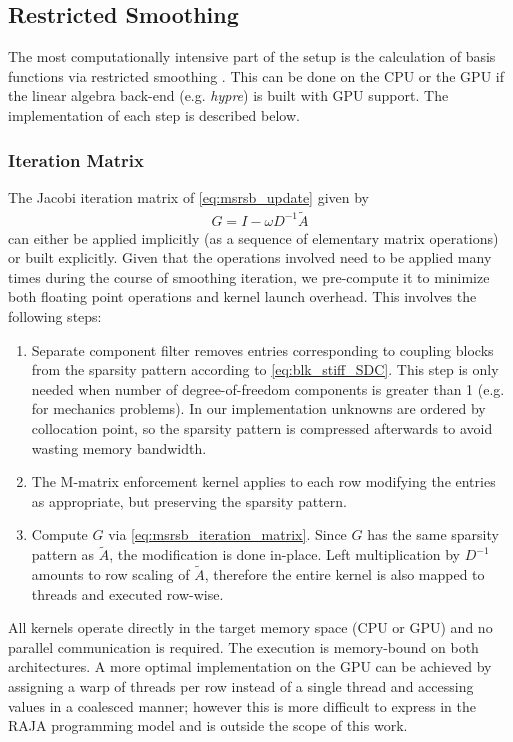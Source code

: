 \subsection{Restricted Smoothing}
\label{subsec:par_kernels_msrsb}

The most computationally intensive part of the setup is the calculation of basis functions via restricted smoothing .   This can be done on the CPU or the GPU if the linear algebra back-end (e.g. \textit{hypre}) is built with GPU support.   The implementation of each step is described below.

\subsubsection{Iteration Matrix}
\label{subsubsec:par_kernels_msrsb_matrix}

The Jacobi iteration matrix of \cref{eq:msrsb_update} given by 
\begin{align}
    G = I - \omega D^{-1} \widetilde{A} \label{eq:msrsb_iteration_matrix}
\end{align}
can either be applied implicitly (as a sequence of elementary matrix operations) or built explicitly.   Given that the operations involved need to be applied many times during the course of smoothing iteration, we pre-compute it to minimize both floating point operations and kernel launch overhead.   This involves the following steps:
\begin{enumerate}
    \item Separate component filter removes entries corresponding to coupling blocks from the sparsity pattern according to \cref{eq:blk_stiff_SDC}.   This step is only needed when number of degree-of-freedom components is greater than 1 (e.g. for mechanics problems).   In our implementation unknowns are ordered by collocation point, so the sparsity pattern is compressed afterwards to avoid wasting memory bandwidth.
    \item The M-matrix enforcement kernel applies  to each row modifying the entries as appropriate, but preserving the sparsity pattern.
    \item Compute $G$ via \cref{eq:msrsb_iteration_matrix}.   Since $G$ has the same sparsity pattern as $\widetilde{A}$, the modification is done in-place.   Left multiplication by $D^{-1}$ amounts to row scaling of $\widetilde{A}$, therefore the entire kernel is also mapped to threads and executed row-wise.
\end{enumerate}
All kernels operate directly in the target memory space (CPU or GPU) and no parallel communication is required.   The execution is memory-bound on both architectures.    A more optimal implementation on the GPU can be achieved by assigning a warp of threads per row instead of a single thread and accessing values in a coalesced manner; however this is more difficult to express in the RAJA programming model and is outside the scope of this work.


